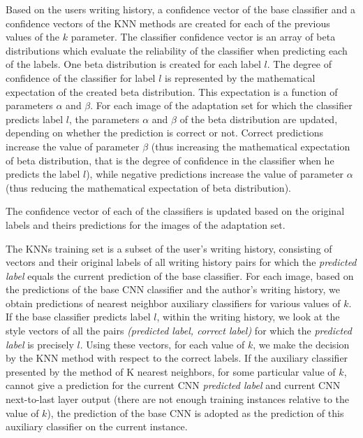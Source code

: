 \documentclass{article}
\begin{document}
Based on the users writing history, a confidence vector of the base classifier and a confidence vectors of the KNN methods are created for each of the previous values of the $k$ parameter.
The classifier confidence vector is an array of beta distributions %
which evaluate the reliability of the classifier when predicting each of the labels.
One beta distribution is created for each label $l$.
The degree of confidence of the classifier for label $l$ is represented by the mathematical expectation of the created beta distribution.
This expectation is a function of parameters $\alpha$  and $\beta$.
For each image of the adaptation set for which the classifier predicts label $l$, the parameters $\alpha$  and $\beta$ of the beta distribution are updated, depending on whether the prediction is correct or not.
Correct predictions increase the value of parameter $\beta$
(thus increasing the mathematical expectation of beta distribution, that is the degree of confidence in the classifier when he predicts the label $l$),
while negative predictions increase the value of parameter $\alpha$
(thus reducing the mathematical expectation of beta distribution).

The confidence vector of each of the classifiers is updated based on the original labels and theirs predictions for the images of the adaptation set.

The KNNs training set is a subset of the user's writing history, consisting of vectors and their original labels of all writing history pairs for
which the \textit{predicted label} equals the current prediction of the base classifier. 
For each image, based on the predictions of the base CNN classifier and the author's writing history, we obtain predictions of nearest neighbor auxiliary classifiers for various values of $k$.
If the base classifier predicts label $l$, within the writing history, we look at the style vectors of all the pairs \textit{(predicted label, correct label)} for which the \textit{predicted label} is precisely $l$.
Using these vectors, for each value of $k$, we make the decision by the KNN method with respect to the correct labels. 
If the auxiliary classifier presented by the method of K nearest neighbors, for some particular value of $k$, cannot give a prediction for the 
current CNN \textit{predicted label} and current CNN next-to-last layer output (there are not enough training instances relative to the value of $k$), 
the prediction of the base CNN is adopted as the prediction of this auxiliary classifier on the current instance. 
\end{document}
